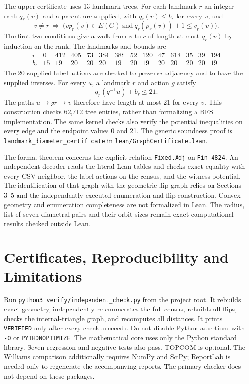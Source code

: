 \documentclass[11pt]{article}
\begin{document}
The upper certificate uses 13 landmark trees. For each landmark $r$ an
integer rank $q_r(v)$ and a parent are supplied, with $q_r(v)\leq b_r$ for
every $v$, and
\[
v\ne r\ \Longrightarrow\
\bigl(vp_r(v)\in E(G)\ \text{and}\ q_r(p_r(v))+1\leq q_r(v)\bigr).
\]
The first two conditions give a walk from $v$ to $r$ of length at most
$q_r(v)$ by induction on the rank. The landmarks and bounds are
\[
\begin{array}{c|rrrrrrrrrrrrr}
r&0&412&405&73&384&388&52&120&47&618&35&39&194\\
b_r&15&19&20&20&20&19&20&19&20&20&20&20&19
\end{array}
\]
The 20 supplied label actions are checked to preserve adjacency and to have
the supplied inverses. For every $u$, a landmark $r$ and action $g$ satisfy
\[
q_r(g^{-1}u)+b_r\leq21.
\]
The paths $u\to gr\to v$ therefore have length at most 21 for every $v$.
This construction checks 62,712 tree entries, rather than formalizing a BFS
implementation. The same kernel checks also verify the potential inequalities
on every edge and the endpoint values 0 and 21. The generic soundness proof is
\texttt{landmark\_diameter\_certificate} in \texttt{lean/GraphCertificate.lean}.

The formal theorem concerns the explicit relation \texttt{Fixed.Adj} on
\texttt{Fin 4824}. An independent decoder reads the literal Lean tables and
checks exact equality with every CSV neighbor, the label actions on the census,
and the witness potential. The identification of that graph with the geometric
flip graph relies on Sections 3--5 and the independently executed enumeration
and flip construction. Convex geometry and enumeration completeness are not
formalized in Lean. The radius, list of seven diametral pairs and their orbit
sizes remain exact computational results checked outside Lean.

\section{Certificates, Reproducibility and Limitations}
Run \texttt{python3 verify/independent\_check.py} from the project root. It
rebuilds exact geometry, independently re-enumerates the full census, rebuilds
all flips, checks the internal-triangle graph, and recomputes all distances.
It prints \texttt{VERIFIED} only after every check succeeds. Do not disable
Python assertions with \texttt{-O} or \texttt{PYTHONOPTIMIZE}.
The mathematical core uses only the Python standard library. Seven regression
and negative tests also pass. TOPCOM is optional. The Williams comparison additionally requires NumPy and
SciPy; ReportLab is needed only to regenerate the accompanying reports.
The primary checker does not depend on these packages.
\end{document}
